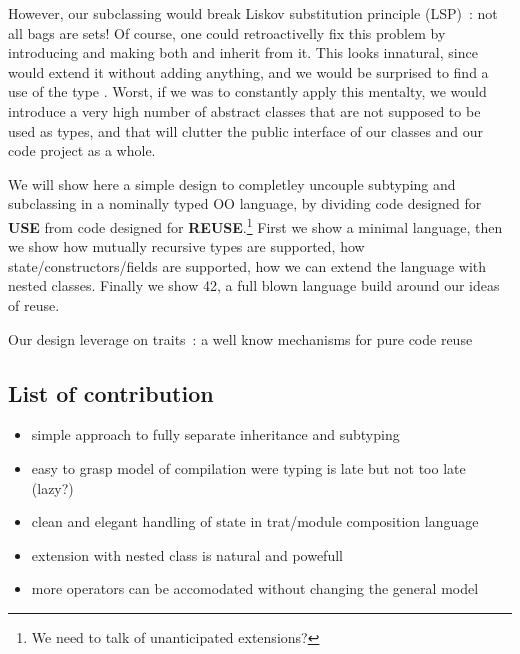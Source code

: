 However, our subclassing would break Liskov substitution principle (LSP)~\cite{martin2000design}: not all bags are sets!
Of course, one could retroactivelly fix this problem by introducing \Q@AbstractSetOrBag@
and making both \Q@Bag@ and \Q@Set@ inherit from it.
This looks innatural, since \Q@Set@ would extend it without adding anything,
and we would be surprised to find a use of the type \Q@AbstractSetOrBag@.
Worst, if we was to constantly apply this mentalty, we would introduce a very high number
of abstract classes that are not supposed to be used as types, and that will clutter the 
public interface of our classes and our code project as a whole.

We will show here a simple design to completley uncouple subtyping
and subclassing in a nominally typed OO language,
by dividing code designed for \textbf{USE}
from code designed for \textbf{REUSE}.\footnote{We need to talk of unanticipated extensions?}
First we show a minimal language, then we show how mutually recursive types
are supported, how state/constructors/fields are supported,
how we can extend the language with nested classes.
Finally we show 42, a full blown language build around our ideas of reuse.

Our design leverage on traits~\cite{ducasse2006traits}: a well know mechanisms for pure
code reuse


\subsection{List of contribution}
\begin{itemize}
\item simple approach to fully separate inheritance and subtyping
\item easy to grasp model of compilation were typing is late but not too late (lazy?)
\item clean and elegant handling of state in trat/module composition language
\item extension with nested class is natural and powefull
\item more operators can be accomodated without changing the general model
\end{itemize}
